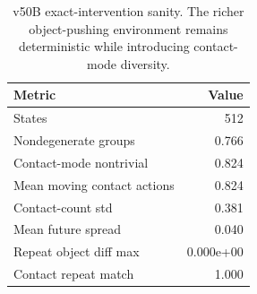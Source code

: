 \begin{table}[t]
\centering
\small
\begin{tabular}{lr}
\toprule
Metric & Value \\
\midrule
States & 512 \\
Nondegenerate groups & 0.766 \\
Contact-mode nontrivial & 0.824 \\
Mean moving contact actions & 0.824 \\
Contact-count std & 0.381 \\
Mean future spread & 0.040 \\
Repeat object diff max & 0.000e+00 \\
Contact repeat match & 1.000 \\
\bottomrule
\end{tabular}
\caption{v50B exact-intervention sanity. The richer object-pushing environment remains deterministic while introducing contact-mode diversity.}
\label{tab:v50b_rich_exact_intervention_sanity}
\end{table}
